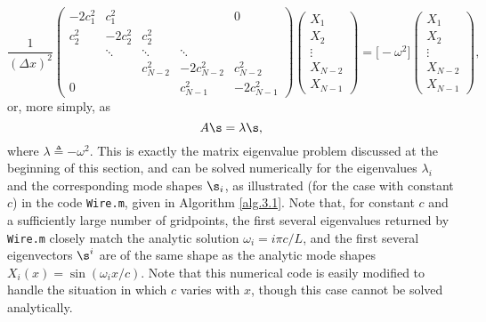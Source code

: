 \begin{equation*}
\frac{1}{(\Delta x)^2}
\begin{pmatrix}
-2c^2_1 &  c^2_1  &                &                  &         0        \\
 c^2_2  & -2c^2_2 &   c^2_2   &                  &                  \\
	     & \ddots       &  \ddots        &    \ddots        &                  \\
	     &              & c^2_{N-2} & -2c^2_{N-2} & c^2_{N-2}   \\
     0       &              &                &  c^2_{N-1}  & -2c^2_{N-1}
\end{pmatrix}
\begin{pmatrix} X_1 \\ X_2 \\ \vdots \\ X_{N-2} \\ X_{N-1} \end{pmatrix}
=  \Big[ - \omega^2  \Big]
\begin{pmatrix} X_1 \\ X_2 \\ \vdots \\ X_{N-2} \\ X_{N-1} \end{pmatrix},
\end{equation*}
or, more simply, as
\begin{equation}
A \s = \lambda \s,
\label{evalproblemSOV}
\end{equation}
where $\lambda \triangleq -\omega^2$.  This is exactly the matrix
eigenvalue problem discussed at the beginning of this section, and can
be solved numerically for the eigenvalues $\lambda_i$ and the
corresponding mode shapes $\s_i$, as illustrated (for the case with constant $c$) in the
code {\tt Wire.m}, given in Algorithm \ref{alg.3.1}.  Note that, for
constant $c$ and a sufficiently large number of gridpoints, the
first several eigenvalues returned by {\tt Wire.m} closely match the
analytic solution $\omega_i=i \pi c / L$, and the first
several eigenvectors $\s^i$ are of the same shape as the analytic
mode shapes $X_{i}(x)=\sin(\omega_i x / c)$.  Note that this
numerical code is easily modified to handle the situation in which
$c$ varies with $x$, though this case cannot be solved
analytically.
\clearpage

